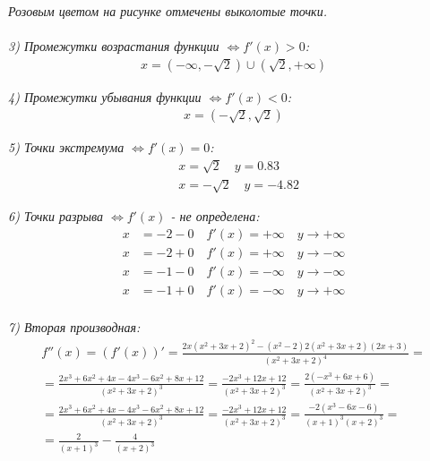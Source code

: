 \documentclass[a4paper,11pt]{article}
\begin{document}
\noindent \textit{Розовым цветом на рисунке отмечены выколотые точки.} \\ \\
\noindent \textsl{3) Промежутки возрастания функции   $\Longleftrightarrow f'(x) > 0 $:}
\begin{gather*}
x = (-\infty, -\sqrt{2}) \cup (\sqrt{2}, +\infty)
\end{gather*}

\noindent \textsl{4) Промежутки убывания функции   $\Longleftrightarrow f'(x) < 0 $:}
\begin{gather*}
x = (-\sqrt{2}, \sqrt{2})
\end{gather*}

\noindent \textsl{5) Точки экстремума   $\Longleftrightarrow f'(x) = 0 $:}
\begin{align*}
&x = \sqrt{2} \quad y = 0.83 \\
&x = -\sqrt{2} \quad y = -4.82
\end{align*}

\noindent \textsl{6) Точки разрыва $ \Longleftrightarrow f'(x) $  - не определена:}
\begin{align*}
x &= -2-0 \quad f'(x) = +\infty \quad y \rightarrow +\infty\\
x &= -2+0 \quad f'(x) = +\infty \quad y \rightarrow -\infty\\
x &= -1-0 \quad f'(x) = -\infty \quad y \rightarrow -\infty \\
x &= -1+0 \quad f'(x) = -\infty \quad y \rightarrow +\infty \\
\end{align*}

\noindent \textsl{7) Вторая производная:}
\begin{gather*}	
f''(x) = (f'(x))' = \frac{2x(x^2 + 3x + 2)^2 - (x^2 - 2)2(x^2 + 3x + 2)(2x + 3)}{(x^2 + 3x + 2)^4} = \\
= \frac{2x^3 + 6x^2 + 4x - 4x^3 - 6x^2 + 8x + 12}{(x^2 + 3x + 2)^3} = \frac{-2x^3 + 12x + 12}{(x^2 + 3x + 2)^3} = \frac{2(-x^3 + 6x + 6)}{(x^2 + 3x + 2)^3} = \\
= \frac{2x^3 + 6x^2 + 4x - 4x^3 - 6x^2 + 8x + 12}{(x^2 + 3x + 2)^3} = \frac{-2x^3 + 12x + 12}{(x^2 + 3x + 2)^3} = \frac{-2(x^3 - 6x - 6)}{(x + 1)^3(x + 2)^3} = \\
= \frac{2}{(x + 1)^3} - \frac{4}{(x + 2)^3}\\
\end{gather*}
\end{document}
